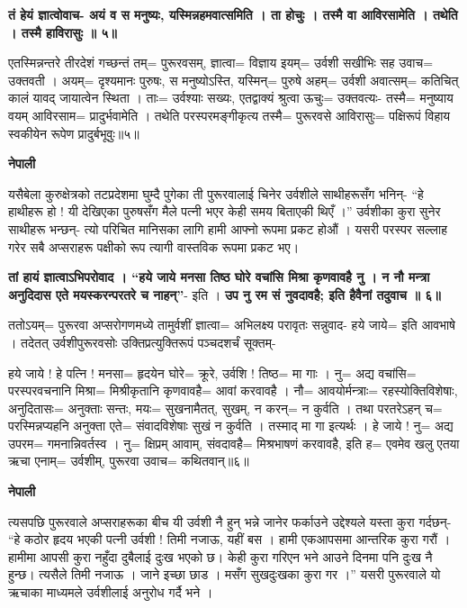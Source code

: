 \documentclass[11pt, a5paper]{article}
\begin{document}
\textbf{तं हेयं ज्ञात्वोवाच- अयं व स मनुष्यः, यस्मिन्नहमवात्समिति । ता  होचुः । तस्मै वा आविरसामेति । तथेति । तस्मै हाविरासुः ॥ ५॥}

एतस्मिन्नन्तरे तीरदेशं गच्छन्तं तम्= पुरूरवसम्, ज्ञात्वा= विज्ञाय इयम्= उर्वशी सखीभिः सह उवाच= उक्तवती । अयम्= दृश्यमानः पुरुषः,  स मनुष्योऽस्ति, यस्मिन्= पुरुषे अहम्= उर्वशी अवात्सम्= कतिचित् कालं यावद् जायात्वेन स्थिता । ताः= उर्वश्याः सख्यः, एतद्वाक्यं श्रुत्वा ऊचुः= उक्तवत्यः- तस्मै= मनुष्याय वयम् आविरसाम= प्रादुर्भवामेति । तथेति परस्परमङ्गीकृत्य तस्मै= पुरूरवसे आविरासुः= पक्षिरूपं विहाय स्वकीयेन रूपेण प्रादुर्बभूवुः॥५॥

\textbf{नेपाली}

यसैबेला कुरुक्षेत्रको तटप्रदेशमा घुम्दै पुगेका ती पुरूरवालाई चिनेर उर्वशीले साथीहरूसँग भनिन्- “हे हाथीहरू हो ! यी देखिएका पुरुषसँग मैले पत्नी भएर केही समय बिताएकी थिएँ ।” उर्वशीका कुरा सुनेर साथीहरू भन्छन्- त्यो परिचित मानिसका लागि हामी आफ्नो रूपमा प्रकट होऔं । यसरी परस्पर सल्लाह गरेर सबै अप्सराहरू पक्षीको रूप त्यागी वास्तविक रूपमा प्रकट भए।

\textbf{तां हायं ज्ञात्वाऽभिपरोवाद । “हये जाये मनसा तिष्ठ घोरे वचांसि मिश्रा कृणवावहै नु । न नौ मन्त्रा अनुदिदास एते मयस्करन्परतरे च नाहन्”}- इति । \textbf{उप नु रम सं नुवदावहै; इति हैवैनां तदुवाच ॥ ६॥}

ततोऽयम्= पुरूरवा अप्सरोगणमध्ये तामुर्वशीं ज्ञात्वा= अभिलक्ष्य परावृतः सन्नुवाद- हये जाये= इति आवभाषे । तदेतत् उर्वशीपुरूरवसोः उक्तिप्रत्युक्तिरूपं पञ्चदशर्चं सूक्तम्-

हये जाये ! हे पत्नि ! मनसा= हृदयेन घोरे= क्रूरे, उर्वशि ! तिष्ठ= मा गाः । नु= अद्य वचांसि= परस्परवचनानि मिश्रा= मिश्रीकृतानि कृणवावहै= आवां करवावहै । नौ= आवयोर्मन्त्राः= रहस्योक्तिविशेषाः, अनुदितासः= अनुक्ताः सन्तः, मयः= सुखनामैतत्, सुखम्, न करन्= न कुर्वति । तथा परतरेऽहन् च= परस्मिन्नप्यहनि अनुक्ता एते= संवादविशेषाः सुखं न कुर्वति । तस्माद् मा गा इत्यर्थः । हे जाये ! नु= अद्य उपरम= गमनान्निवर्तस्व । नु= क्षिप्रम् आवाम्, संवदावहै= मिश्रभाषणं करवावहै, इति ह= एवमेव खलु एतया ऋचा  एनाम्= उर्वशीम्, पुरूरवा उवाच= कथितवान्॥६॥

\textbf{नेपाली}

त्यसपछि पुरूरवाले अप्सराहरूका बीच यी उर्वशी नै हुन् भन्ने जानेर फर्काउने उद्देश्यले यस्ता कुरा गर्दछन्- “हे कठोर हृदय भएकी पत्नी उर्वशी ! तिमी नजाऊ, यहीं बस । हामी एकआपसमा  आन्तरिक कुरा गरौं । हामीमा आपसी कुरा नहुँदा दुबैलाई दुःख भएको छ। केही कुरा गरिएन भने आउने दिनमा पनि दुःख नै हुन्छ। त्यसैले तिमी नजाऊ । जाने इच्छा छाड । मसँग सुखदुःखका कुरा गर ।” यसरी पुरूरवाले यो ऋचाका माध्यमले उर्वशीलाई अनुरोध गर्दै भने ।
\end{document}
